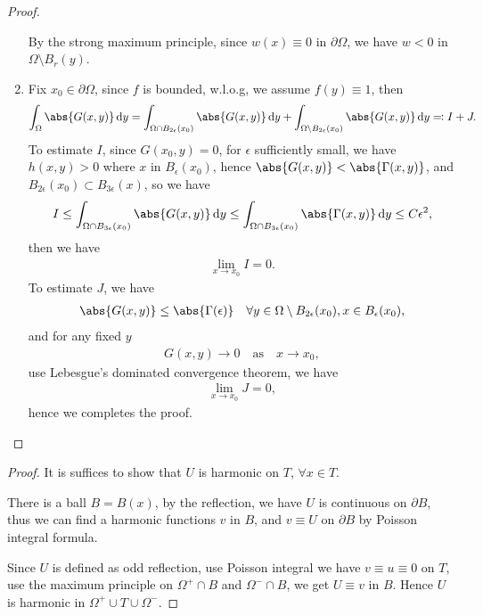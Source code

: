 \documentclass[a4paper]{article}
\newcommand\diff{\,\mathrm{d}}
\DeclarePairedDelimiter{\abs}\lvert\rvert
\begin{document}
\begin{proof}
\begin{enumerate}
By the strong maximum principle, since $w(x) \equiv 0$ in $\partial\Omega$, we have $w<0$ in $\Omega\setminus B_r(y)$.
\item Fix $x_0 \in \partial\Omega$, since $f$ is bounded, w.l.o.g, we assume $f(y) \equiv 1$, then
\begin{equation*}
\int_{\Omega} \abs{G(x,y)}\diff y = \int_{\Omega\cap B_{2\epsilon}(x_0)} \abs{G(x,y)}\diff y
+ \int_{\Omega\setminus B_{2\epsilon}(x_0)} \abs{G(x,y)}\diff y \eqqcolon I + J.
\end{equation*}
To estimate $I$, since $G(x_0, y) = 0$, for $\epsilon$ sufficiently small,
we have $h(x,y) > 0$ where $x$ in $B_{\epsilon}(x_0)$, hence $\abs{G(x,y)} < \abs{\Gamma(x,y)}$,
and $B_{2\epsilon}(x_0) \subset B_{3\epsilon}(x)$, so we have
\begin{align*}
I \leq \int_{\Omega\cap B_{3\epsilon}(x_0)} \abs{G(x,y)}\diff y
\leq \int_{\Omega\cap B_{3\epsilon}(x_0)} \abs{\Gamma(x,y)}\diff y \leq C\epsilon^2,
\end{align*}
then we have
\begin{align*}
\lim_{x \to x_0}I = 0.
\end{align*}
To estimate $J$, we have
\begin{align*}
\abs{G(x,y)} \leq \abs{\Gamma(\epsilon)} \quad \forall y \in \Omega\setminus B_{2\epsilon}(x_0), x \in B_{\epsilon}(x_0),
\end{align*}
and for any fixed $y$
\begin{align*}
G(x,y) \to 0 \quad \text{as} \quad x \to x_0,
\end{align*}
use Lebesgue’s dominated convergence theorem, we have
\begin{align*}
\lim_{x \to x_0} J = 0,
\end{align*}
hence we completes the proof.
\end{enumerate}
\end{proof}
\begin{proof}
It is suffices to show that $U$ is harmonic on $T$, $\forall x \in T$.

There is a ball $B = B(x)$, by the reflection, we have $U$ is continuous on $\partial B$,
thus we can find a harmonic functions $v$ in $B$,
and $v \equiv U$ on $\partial B$ by Poisson integral formula.

Since $U$ is defined as odd reflection, use Poisson integral we have $v \equiv u \equiv 0$ on $T$,
use the maximum principle on $\Omega^+\cap B$ and $\Omega^-\cap B$, we get $U \equiv v$ in $B$.
Hence $U$ is harmonic in $\Omega^+\cup T\cup\Omega^-$.
\end{proof}
\end{document}
